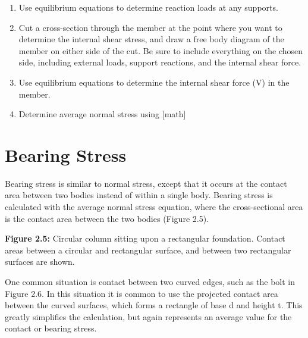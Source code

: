 \documentclass[
  letterpaper,
  DIV=11,
  numbers=noendperiod]{scrreprt}
\begin{document}
\begin{tcolorbox}[enhanced jigsaw, colback=white, colframe=quarto-callout-note-color-frame, leftrule=.75mm, opacitybacktitle=0.6, colbacktitle=quarto-callout-note-color!10!white, arc=.35mm, bottomrule=.15mm, breakable, title={Step-by-step: Needs title}, left=2mm, titlerule=0mm, toptitle=1mm, toprule=.15mm, opacityback=0, rightrule=.15mm, coltitle=black, bottomtitle=1mm]

\begin{enumerate}
\def\labelenumi{\arabic{enumi}.}
\item
  Use equilibrium equations to determine reaction loads at any supports.
\item
  Cut a cross-section through the member at the point where you want to
  determine the internal shear stress, and draw a free body diagram of
  the member on either side of the cut. Be sure to include everything on
  the chosen side, including external loads, support reactions, and the
  internal shear force.
\item
  Use equilibrium equations to determine the internal shear force (V) in
  the member.
\item
  Determine average normal stress using {[}math{]}
\end{enumerate}

\end{tcolorbox}

\section{Bearing Stress}\label{bearing-stress}

Bearing stress is similar to normal stress, except that it occurs at the
contact area between two bodies instead of within a single body. Bearing
stress is calculated with the average normal stress equation, where the
cross-sectional area is the contact area between the two bodies (Figure
2.5).

\textbf{Figure 2.5:} Circular column sitting upon a rectangular
foundation. Contact areas between a circular and rectangular surface,
and between two rectangular surfaces are shown.

One common situation is contact between two curved edges, such as the
bolt in Figure 2.6. In this situation it is common to use the projected
contact area between the curved surfaces, which forms a rectangle of
base d and height t. This greatly simplifies the calculation, but again
represents an average value for the contact or bearing stress.
\end{document}
